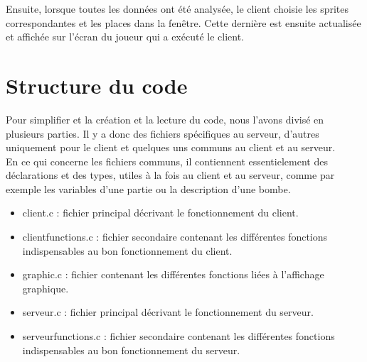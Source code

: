 \vspace{0.5cm}

Ensuite, lorsque toutes les données ont été analysée, le client choisie les sprites correspondantes et les places dans la fenêtre. Cette dernière est ensuite actualisée et affichée sur l'écran du joueur qui a exécuté le client. 



\section*{Structure du code}

Pour simplifier et la création et la lecture du code, nous l'avons divisé en plusieurs parties. Il y a donc des fichiers spécifiques au serveur, d'autres uniquement pour le client et quelques uns communs au client et au serveur.\\

En ce qui concerne les fichiers communs, il contiennent essentielement des déclarations et des types, utiles à la fois au client et au serveur, comme par exemple les variables d'une partie ou la description d'une bombe.\\

\begin{itemize}
	\item client.c : fichier principal décrivant le fonctionnement du client.
	\item clientfunctions.c : fichier secondaire contenant les différentes fonctions indispensables au bon fonctionnement du client.
	\item graphic.c : fichier contenant les différentes fonctions liées à l'affichage graphique.
\end{itemize}

\vspace{0.5cm}

\begin{itemize}
	\item serveur.c : fichier principal décrivant le fonctionnement du serveur.
	\item serveurfunctions.c : fichier secondaire contenant les différentes fonctions indispensables au bon fonctionnement du serveur.
\end{itemize}
